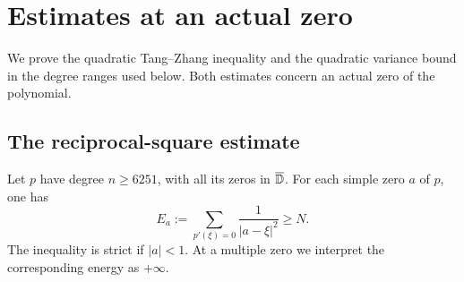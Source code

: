 \section{Estimates at an actual zero}\label{sec:actual-roots}

We prove the quadratic Tang--Zhang inequality \cite{ZhangQuadratic}
and the quadratic variance bound \cite{BouthatFallat,ZhangVariance}
in the degree ranges used below. Both estimates concern an actual
zero of the polynomial.

\subsection{The reciprocal-square estimate}

\begin{proposition}\label{ar:energy}
Let $p$ have degree $n\ge6251$, with all its zeros in $\overline{\mathbb D}$.
For each simple zero $a$ of $p$, one has
\[
 E_a:=\sum_{p'(\xi)=0}\frac1{|a-\xi|^2}\ge N.
\]
The inequality is strict if $|a|<1$.  At a multiple zero we interpret
the corresponding energy as $+\infty$.
\end{proposition}

